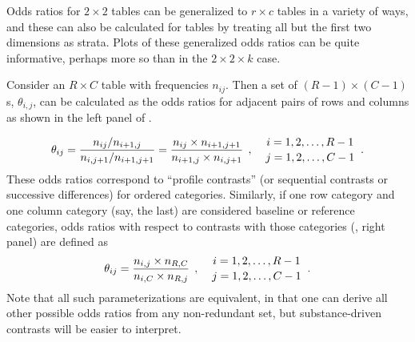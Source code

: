 \documentclass[10pt,krantz2]{krantz}\usepackage[]{graphicx}\usepackage[]{color}
\begin{document}
Odds ratios for $2 \times 2$ tables can be generalized to $r \times c$ tables in a variety of
ways, and these can also be calculated for \nway tables by treating all but the first two dimensions as strata.
Plots of these generalized odds ratios can be quite informative, perhaps more so than in the $2 \times 2 \times k$ case.

Consider an $R \times C$ table with frequencies $n_{ij}$.  Then a set of $(R-1)\times(C-1)$
s, $\theta_{i,j}$, can be calculated as the odds ratios for adjacent pairs of rows and columns
as shown in the left panel of .

\begin{equation*}
    \theta_{ij} = \frac{n_{ij} / n_{i+1, j}} { n_{i,j+1} / n_{i+1, j+1}}
  	            = \frac{n_{ij} \times n_{i+1, j+1}} { n_{i+1, j} \times n_{i,j+1} } 
\:\: , \quad 
{{i=1, 2, \dots, R-1} \atop {j=1, 2, \dots, C-1}}
\:\: .
\end{equation*}
These odds ratios correspond to ``profile contrasts''  (or sequential contrasts or successive differences) for ordered categories.  Similarly, if one row category and one column category (say, the last)
are considered baseline or reference categories,
odds ratios with respect to contrasts with those categories (, right panel) are defined as
\begin{equation*}
\theta_{ij} = \frac{n_{i,j} \times n_{R,C}}{n_{i,C} \times n_{R,j}}
\:\: , \quad 
{{i=1, 2, \dots, R-1} \atop {j=1, 2, \dots, C-1}}
\:\: .
\end{equation*}
Note that all such parameterizations are equivalent, in that one can derive all
other possible odds ratios from any non-redundant set, but substance-driven contrasts will be easier to interpret.
\end{document}
